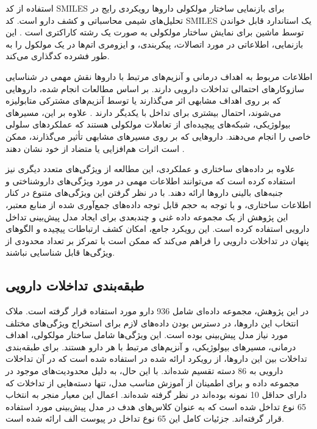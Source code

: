 استفاده از کد SMILES برای بازنمایی ساختار مولکولی داروها رویکردی رایج در تحلیل‌های شیمی محاسباتی و کشف دارو است. کد SMILES یک استاندارد قابل خواندن توسط ماشین برای نمایش ساختار مولکولی به صورت یک رشته کاراکتری است \cite{ref_weininger1988}. این بازنمایی، اطلاعاتی در مورد اتصالات، پیکربندی، و ایزومری اتم‌ها در یک مولکول را به طور فشرده کدگذاری می‌کند.

اطلاعات مربوط به اهداف درمانی و آنزیم‌های مرتبط با داروها نقش مهمی در شناسایی سازوکار‌های احتمالی تداخلات دارویی دارند. بر اساس مطالعات انجام شده، داروهایی که بر روی اهداف مشابهی اثر می‌گذارند یا توسط آنزیم‌های مشترکی متابولیزه می‌شوند، احتمال بیشتری برای تداخل با یکدیگر دارند \cite{ref_ryu2018, ref_deng2020}. علاوه بر این، مسیرهای بیولوژیکی، شبکه‌های پیچیده‌ای از تعاملات مولکولی هستند که عملکردهای سلولی خاصی را انجام می‌دهند. داروهایی که بر روی مسیرهای مشابهی تأثیر می‌گذارند، ممکن است اثرات هم‌افزایی یا متضاد از خود نشان دهند \cite{ref_cascorbi2012}.

علاوه بر داده‌های ساختاری و عملکردی، این مطالعه از ویژگی‌های متعدد دیگری نیز استفاده کرده است که می‌توانند اطلاعات مهمی در مورد ویژگی‌های داروشناختی و جنبه‌های بالینی داروها ارائه دهند. با در نظر گرفتن این ویژگی‌های متنوع در کنار اطلاعات ساختاری، و با توجه به حجم قابل توجه داده‌های جمع‌آوری شده از منابع معتبر، این پژوهش از یک مجموعه داده غنی و چندبعدی برای ایجاد مدل پیش‌بینی تداخل دارویی استفاده کرده است. این رویکرد جامع، امکان کشف ارتباطات پیچیده و الگوهای پنهان در تداخلات دارویی را فراهم می‌کند که ممکن است با تمرکز بر تعداد محدودی از ویژگی‌ها قابل شناسایی نباشند.

\subsection{طبقه‌بندی تداخلات دارویی}

در این پژوهش، مجموعه داده‌ای شامل 936 دارو مورد استفاده قرار گرفته است. ملاک انتخاب این داروها، در دسترس بودن داده‌های لازم برای استخراج ویژگی‌های مختلف مورد نیاز مدل پیش‌بینی بوده است. این ویژگی‌ها شامل ساختار مولکولی، اهداف درمانی، مسیرهای بیولوژیکی، و آنزیم‌های مرتبط با هر دارو هستند. برای طبقه‌بندی تداخلات بین این داروها، از رویکرد ارائه شده در \cite{ref_ryu2018} استفاده شده است که در آن تداخلات دارویی به 86 دسته تقسیم شده‌اند. با این حال، به دلیل محدودیت‌های موجود در مجموعه داده و برای اطمینان از آموزش مناسب مدل، تنها دسته‌هایی از تداخلات که دارای حداقل 10 نمونه بوده‌اند در نظر گرفته شده‌اند. اعمال این معیار منجر به انتخاب 65 نوع تداخل شده است که به عنوان کلاس‌های هدف در مدل پیش‌بینی مورد استفاده قرار گرفته‌اند. جزئیات کامل این 65 نوع تداخل در پیوست الف ارائه شده است.

